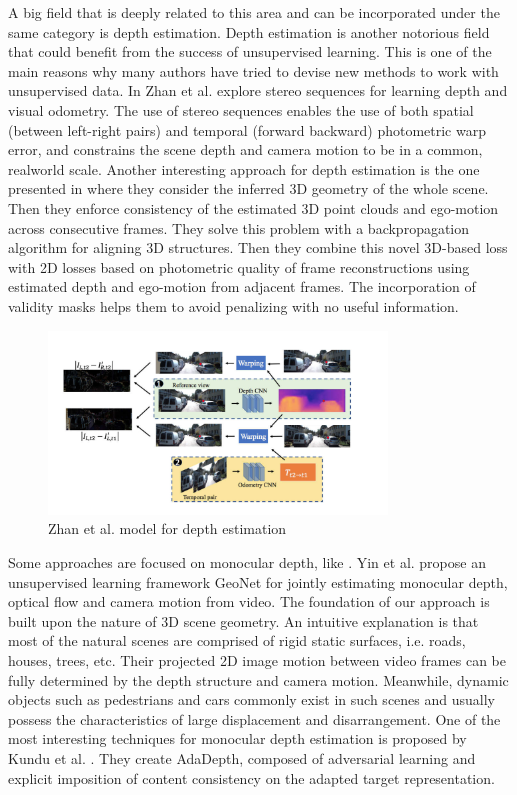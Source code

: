 \documentclass[letterpaper, 10 pt, conference]{ieeeconf}  %
\begin{document}
A big field that is deeply related to this area and can be incorporated under the same category is depth estimation. Depth estimation is another notorious field that could benefit from the success of unsupervised learning. This is one of the main reasons why many authors have tried to devise new methods to work with unsupervised data. In \cite{Zhan_2018_CVPR} Zhan et al. explore stereo sequences for learning depth and visual odometry. The use of stereo sequences enables the use of both spatial (between left-right pairs) and temporal (forward backward) photometric warp error, and constrains the scene depth and camera motion to be in a common, realworld scale. Another interesting approach for depth estimation is the one presented in \cite{Mahjourian_2018_CVPR} where they consider the inferred 3D geometry of the whole scene. Then they enforce consistency of the estimated 3D point clouds and ego-motion across consecutive frames. They solve this problem with a backpropagation algorithm for aligning 3D structures. Then they combine this novel 3D-based loss with 2D losses based on photometric quality of frame reconstructions using estimated depth and ego-motion from adjacent frames. The incorporation of validity masks helps them to avoid penalizing with no useful information. 

\begin{figure}[h!]
\centering
\includegraphics[width=9cm]{zhanmodel.png}
\caption{Zhan et al. model for depth estimation}
\label{fig:zhanmodel}
\end{figure}

Some approaches are focused on monocular depth, like \cite{Yin_2018_CVPR}. Yin et al. propose an unsupervised learning framework GeoNet for jointly estimating monocular depth, optical flow and camera motion from video. The foundation of our approach is built upon the nature of 3D scene geometry. An intuitive explanation is that most of the natural scenes are comprised of rigid static surfaces, i.e. roads, houses, trees, etc. Their projected 2D image motion between video frames can be fully determined by the depth structure and camera motion. Meanwhile, dynamic objects such as pedestrians and cars commonly exist in such scenes and usually possess the characteristics of large displacement and disarrangement. One of the most interesting techniques for monocular depth estimation is proposed by Kundu et al. \cite{Kundu_2018_CVPR}. They create AdaDepth, composed of  adversarial learning and explicit imposition of content consistency on the adapted target representation. 
\end{document}
